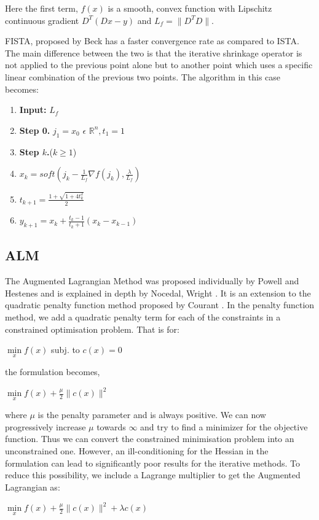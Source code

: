 \documentclass{article} %
\begin{document}
Here the first term, $f(x)$ is a smooth, convex function with Lipschitz continuous gradient $D^T(Dx - y)$ and $L_f = \|D^TD\|$.

FISTA, proposed by Beck \citep{beck2009fast} has a faster convergence rate as compared to ISTA. The main difference between the two is that the iterative shrinkage operator is not applied to the previous point alone but to another point which uses a specific linear combination of the previous two points. The algorithm in this case becomes:

\begin{enumerate}
\item \textbf{Input: }$L_f$
\item \textbf{Step 0. }$j_1 = x_0$ $\epsilon$ $\mathbb{R}^n, t_1 = 1$
\item \textbf{Step $k$.}($k \geq 1$)
\item \hspace{.4cm} $x_k = soft(j_k - \frac{1}{L_f}\nabla f(j_k), \frac{\lambda}{L_f})$
\item \hspace{.4cm} $t_{k+1} = \frac{1+\sqrt{1+4t_k^2}}{2}$
\item \hspace{.4cm} $y_{k+1} = x_k + \frac{t_k-1}{t_k+1}(x_k - x_{k-1})$
\end{enumerate}


  
\vspace{-.2cm}
\subsection{ALM}
\vspace{-.2cm}

The Augmented Lagrangian Method was proposed individually by Powell \citep{powell1964efficient} and Hestenes \citep{hestenes1969multiplier} and is explained in depth by Nocedal, Wright \citep{wright1999numerical}. It is an extension to the quadratic penalty function method proposed by Courant \citep{courant1943variational}. In the penalty function method, we add a quadratic penalty term for each of the constraints in a constrained optimisation problem. That is for:
\begin{center}
$\min\limits_x f(x)$ subj. to $c(x) = 0$
\end{center}
the formulation becomes,
\begin{center}
$\min\limits_x f(x) + \frac{\mu}{2}\|c(x)\|^2$
\end{center}
where $\mu$ is the penalty parameter and is always positive. We can now progressively increase $\mu$ towards $\infty$ and try to find a minimizer for the objective function.
Thus we can convert the constrained minimisation problem into an unconstrained one. However, an ill-conditioning for the Hessian in the formulation can lead to significantly poor results for the iterative methods. To reduce this possibility, we include a Lagrange multiplier to get the Augmented Lagrangian as:
\begin{center}
$\min\limits_x f(x) + \frac{\mu}{2}\|c(x)\|^2 + \lambda c(x)$
\end{center}
\end{document}
